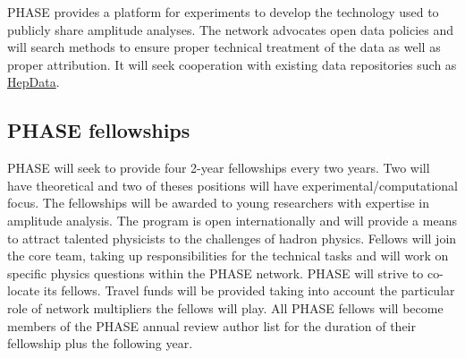 PHASE provides a platform for experiments to develop the technology used to publicly share amplitude analyses. The network advocates open data policies and will search methods to ensure proper technical treatment of the data as well as proper attribution. It will seek cooperation with existing data repositories such as \href{https://hepdata.net/}{HepData}.


\subsection{PHASE fellowships}
\label{sec:fellowships}
PHASE will seek to provide four 2-year fellowships every two years. Two will have theoretical and two of theses positions will have experimental/computational focus. The fellowships will be awarded to young researchers with expertise in amplitude analysis. The program is open internationally and will provide a means to attract talented physicists to the challenges of hadron physics. Fellows will join the core team, taking up responsibilities for the technical tasks and will work on specific physics questions within the PHASE network. PHASE will strive to co-locate its fellows. Travel funds will be provided taking into account the particular role of network multipliers the fellows will play. All PHASE fellows will become members of the PHASE annual review author list for the duration of their fellowship plus the following year.     
